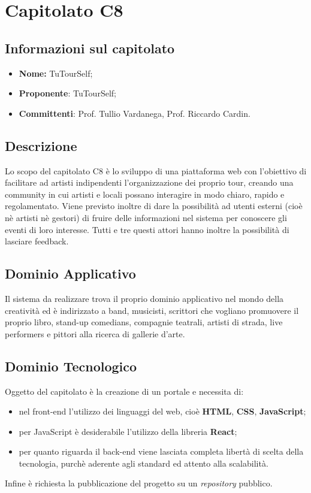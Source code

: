 \section{Capitolato C8}
\subsection{Informazioni sul capitolato}
	\begin{itemize}
		\item \textbf{Nome:}
		 TuTourSelf;
		\item \textbf{Proponente}:
		 TuTourSelf;
		\item \textbf{Committenti}:
		Prof. Tullio Vardanega, Prof. Riccardo Cardin.
	\end{itemize}

\subsection{Descrizione}
	Lo scopo del capitolato C8 è lo sviluppo di una piattaforma web con l'obiettivo di facilitare ad artisti indipendenti l'organizzazione dei proprio tour, creando una community in cui artisti e locali possano interagire in modo chiaro, rapido e regolamentato. 
	Viene previsto inoltre di dare la possibilità ad utenti esterni (cioè nè artisti nè gestori) di fruire delle informazioni nel sistema per conoscere gli eventi di loro interesse. Tutti e tre questi attori hanno inoltre la possibilità di lasciare feedback.
	
\subsection{Dominio Applicativo}
	Il sistema da realizzare trova il proprio dominio applicativo nel mondo della creatività ed è indirizzato a band, musicisti, scrittori che vogliano promuovere
	il proprio libro, stand-up comedians, compagnie teatrali, artisti di strada, live
	performers e pittori alla ricerca di gallerie d’arte.

\subsection{Dominio Tecnologico}
	Oggetto del capitolato è la creazione di un portale e necessita di:
		\begin{itemize}
			\item nel front-end l'utilizzo dei linguaggi del web, cioè \textbf{HTML}, \textbf{CSS}, \textbf{JavaScript};
			\item per JavaScript è desiderabile l'utilizzo della libreria \textbf{React};
			\item per quanto riguarda il back-end viene lasciata completa libertà di scelta della tecnologia, purchè aderente agli standard ed attento alla scalabilità.
		\end{itemize}
		Infine è richiesta la pubblicazione del progetto su un \textit{repository} pubblico.


